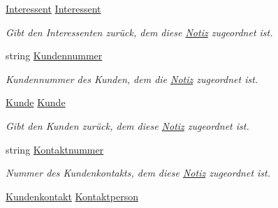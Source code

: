 \begin{DoxyCompactItemize}
\item 
\hyperlink{class_products_1_1_model_1_1_entities_1_1_interessent}{Interessent} \hyperlink{class_products_1_1_model_1_1_entities_1_1_notiz_a8edd17546d3c1e9efa5bcaf2fa7f1732}{Interessent}
\begin{DoxyCompactList}\small\item\em Gibt den Interessenten zurück, dem diese \hyperlink{class_products_1_1_model_1_1_entities_1_1_notiz}{Notiz} zugeordnet ist. \end{DoxyCompactList}\item 
string \hyperlink{class_products_1_1_model_1_1_entities_1_1_notiz_a1dca63fdabb5a1d023ead81c9a628d7b}{Kundennummer}
\begin{DoxyCompactList}\small\item\em Kundennummer des Kunden, dem die \hyperlink{class_products_1_1_model_1_1_entities_1_1_notiz}{Notiz} zugeordnet ist. \end{DoxyCompactList}\item 
\hyperlink{class_products_1_1_model_1_1_entities_1_1_kunde}{Kunde} \hyperlink{class_products_1_1_model_1_1_entities_1_1_notiz_ace6e198bcd8675da7b18e0f3143745cc}{Kunde}
\begin{DoxyCompactList}\small\item\em Gibt den Kunden zurück, dem diese \hyperlink{class_products_1_1_model_1_1_entities_1_1_notiz}{Notiz} zugeordnet ist. \end{DoxyCompactList}\item 
string \hyperlink{class_products_1_1_model_1_1_entities_1_1_notiz_a2abb7d925401c63a07c6a23e0d88e5a6}{Kontaktnummer}
\begin{DoxyCompactList}\small\item\em Nummer des Kundenkontakts, dem diese \hyperlink{class_products_1_1_model_1_1_entities_1_1_notiz}{Notiz} zugeordnet ist. \end{DoxyCompactList}\item 
\hyperlink{class_products_1_1_model_1_1_entities_1_1_kundenkontakt}{Kundenkontakt} \hyperlink{class_products_1_1_model_1_1_entities_1_1_notiz_aa31db98a057738b3144ff1df4348ee5c}{Kontaktperson}

\end{DoxyCompactItemize}
